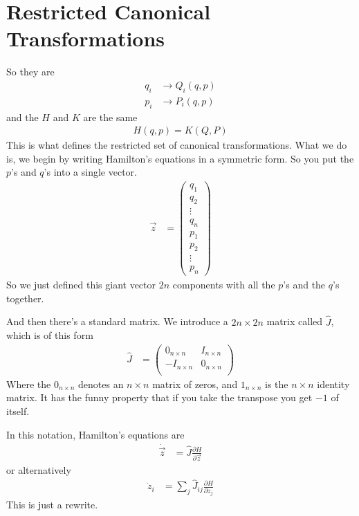 \section{Restricted Canonical Transformations}
So they are
\begin{align}
   q_i &\to Q_i(q, p)\\
   p_i &\to P_i(q, p)
\end{align}
and the $H$ and $K$ are the same
\begin{align}
    H(q, p) = K(Q, P)
\end{align}
This is what defines the restricted set of canonical transformations.
What we do is,
we begin by writing Hamilton's equations in a symmetric form.
So you put the $p$'s and $q$'s into a single vector.
\begin{align}
    \vec{z} &=
    \begin{pmatrix}
        q_1\\
        q_2\\
        \vdots\\
        q_n\\
        p_1\\
        p_2\\
        \vdots\\
        p_n
    \end{pmatrix}
\end{align}
So we just defined this giant vector $2n$ components
with all the $p$'s and the $q$'s together.

And then there's a standard matrix.
We introduce a $2n\times 2n$ matrix called $\hat{J}$,
which is of this form
\begin{align}
    \hat{J} &=
    \begin{pmatrix}
        0_{n\times n} & I_{n\times n}\\
        - I_{n\times n} & 0_{n\times n}\\
    \end{pmatrix}
\end{align}
Where the $0_{n\times n}$ denotes an $n\times n$ matrix of zeros,
and $1_{n\times n}$ is the $n\times n$ identity matrix.
It has the funny property that if you take the transpose you get $-1$ of itself.

In this notation,
Hamilton's equations are
\begin{align}
    \dot{\vec{z}} &=
    \hat{J}
    \frac{\partial H}{\partial \vec{z}}
\end{align}
or alternatively
\begin{align}
    \dot{z}_i
    &=
    \sum_{j}
    \hat{J}_{ij}
    \frac{\partial H}{\partial z_j}
\end{align}
This is just a rewrite.

